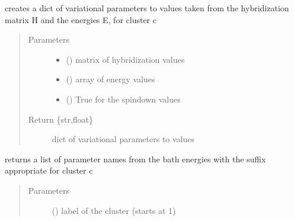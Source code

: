 \documentclass[letterpaper,10pt,english]{sphinxmanual}
\begin{document}
\begin{fulllineitems}
\begin{fulllineitems}
\label{\detokenize{cdmft:pyqcm.cdmft.general_bath.varia}}
\sphinxAtStartPar
creates a dict of variational parameters to values taken from the hybridization matrix H and the energies E, for cluster c
\begin{quote}\begin{description}
\item[{Parameters}] \leavevmode\begin{itemize}
\item {} 
\sphinxAtStartPar
{} () \textendash{} matrix of hybridization values

\item {} 
\sphinxAtStartPar
{} () \textendash{} array of energy values

\item {} 
\sphinxAtStartPar
{} () \textendash{} True for the spin\sphinxhyphen{}down values

\end{itemize}

\item[{Return \{str,float\}}] \leavevmode
\sphinxAtStartPar
dict of variational parameters to values

\end{description}\end{quote}

\end{fulllineitems}


\begin{fulllineitems}
\label{\detokenize{cdmft:pyqcm.cdmft.general_bath.varia_E}}
\sphinxAtStartPar
returns a list of parameter names from the bath energies with the suffix appropriate for cluster c
\begin{quote}\begin{description}
\item[{Parameters}] \leavevmode
\sphinxAtStartPar
{} () \textendash{} label of the cluster (starts at 1)


\end{description}
\end{quote}
\end{fulllineitems}
\end{fulllineitems}
\end{document}
